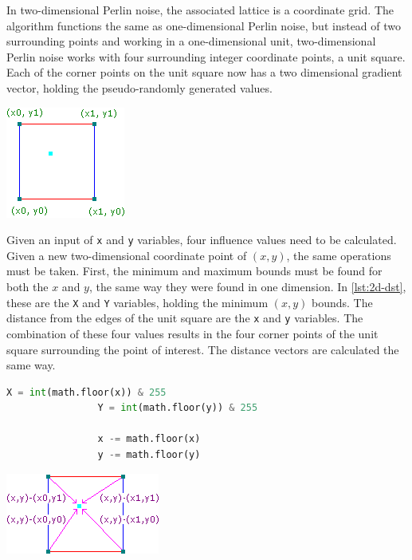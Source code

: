 \documentclass[10pt]{report}
\begin{document}
			In two-dimensional Perlin noise, the associated lattice is a coordinate grid. The algorithm functions the same as one-dimensional Perlin noise, but instead of two surrounding points and working in a one-dimensional unit, two-dimensional Perlin noise works with four surrounding integer coordinate points, a unit square. Each of the corner points on the unit square now has a two dimensional gradient vector, holding the pseudo-randomly generated values. 
			
			\begin{minipage}{\textwidth}
				\centering
				\includegraphics[scale=1.0]{cornergridpoints}
				\label{fig:cornergridpoints}
			\end{minipage} 
		
			Given an input of \lstinline|x| and \lstinline|y| variables, four influence values need to be calculated. Given a new two-dimensional coordinate point of \((x,y)\), the same operations must be taken. First, the minimum and maximum bounds must be found for both the \(x\) and \(y\), the same way they were found in one dimension. In \autoref{lst:2d-dst}, these are the \lstinline|X| and \lstinline|Y| variables, holding the minimum \((x,y)\) bounds. The distance from the edges of the unit square are the \lstinline|x| and \lstinline|y| variables. The combination of these four values results in the four corner points of the unit square surrounding the point of interest. The distance vectors are calculated the same way. 
			
			\begin{lstlisting}[label={lst:2d-dst}, language=Python, frame=none, caption={Calculating the distance for two-dimensions.}, captionpos=b]
				X = int(math.floor(x)) & 255   
				Y = int(math.floor(y)) & 255
				
				x -= math.floor(x)
				y -= math.floor(y)
			\end{lstlisting}
		
			\begin{minipage}{\textwidth}
				\centering
				\includegraphics[scale=0.75]{2d_dist}
				\label{fig:2d_dist}
			\end{minipage} 
		
\end{document}
